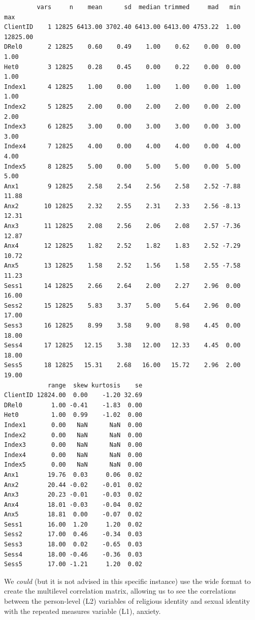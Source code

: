 \documentclass[
  english,
]{book}
\begin{document}
\begin{verbatim}
         vars     n    mean      sd  median trimmed     mad   min      max
ClientID    1 12825 6413.00 3702.40 6413.00 6413.00 4753.22  1.00 12825.00
DRel0       2 12825    0.60    0.49    1.00    0.62    0.00  0.00     1.00
Het0        3 12825    0.28    0.45    0.00    0.22    0.00  0.00     1.00
Index1      4 12825    1.00    0.00    1.00    1.00    0.00  1.00     1.00
Index2      5 12825    2.00    0.00    2.00    2.00    0.00  2.00     2.00
Index3      6 12825    3.00    0.00    3.00    3.00    0.00  3.00     3.00
Index4      7 12825    4.00    0.00    4.00    4.00    0.00  4.00     4.00
Index5      8 12825    5.00    0.00    5.00    5.00    0.00  5.00     5.00
Anx1        9 12825    2.58    2.54    2.56    2.58    2.52 -7.88    11.88
Anx2       10 12825    2.32    2.55    2.31    2.33    2.56 -8.13    12.31
Anx3       11 12825    2.08    2.56    2.06    2.08    2.57 -7.36    12.87
Anx4       12 12825    1.82    2.52    1.82    1.83    2.52 -7.29    10.72
Anx5       13 12825    1.58    2.52    1.56    1.58    2.55 -7.58    11.23
Sess1      14 12825    2.66    2.64    2.00    2.27    2.96  0.00    16.00
Sess2      15 12825    5.83    3.37    5.00    5.64    2.96  0.00    17.00
Sess3      16 12825    8.99    3.58    9.00    8.98    4.45  0.00    18.00
Sess4      17 12825   12.15    3.38   12.00   12.33    4.45  0.00    18.00
Sess5      18 12825   15.31    2.68   16.00   15.72    2.96  2.00    19.00
            range  skew kurtosis    se
ClientID 12824.00  0.00    -1.20 32.69
DRel0        1.00 -0.41    -1.83  0.00
Het0         1.00  0.99    -1.02  0.00
Index1       0.00   NaN      NaN  0.00
Index2       0.00   NaN      NaN  0.00
Index3       0.00   NaN      NaN  0.00
Index4       0.00   NaN      NaN  0.00
Index5       0.00   NaN      NaN  0.00
Anx1        19.76  0.03     0.06  0.02
Anx2        20.44 -0.02    -0.01  0.02
Anx3        20.23 -0.01    -0.03  0.02
Anx4        18.01 -0.03    -0.04  0.02
Anx5        18.81  0.00    -0.07  0.02
Sess1       16.00  1.20     1.20  0.02
Sess2       17.00  0.46    -0.34  0.03
Sess3       18.00  0.02    -0.65  0.03
Sess4       18.00 -0.46    -0.36  0.03
Sess5       17.00 -1.21     1.20  0.02
\end{verbatim}

We \emph{could} (but it is not advised in this specific instance) use the wide format to create the multilevel correlation matrix, allowing us to see the correlations between the person-level (L2) variables of religious identity and sexual identity with the repeated measures variable (L1), anxiety.
\end{document}

